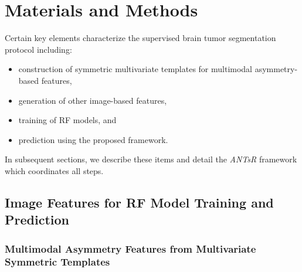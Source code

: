 \documentclass[preprint,authoryear,review,12pt]{elsarticle}
\begin{document}
%
%

\section{Materials and Methods}

Certain key elements characterize the supervised brain tumor segmentation
protocol including:
\begin{itemize}
  \item construction of symmetric multivariate templates for multimodal 
        asymmetry-based features,
  \item generation of other image-based features,
  \item training of RF models, and
  \item prediction using the proposed framework.
\end{itemize}
In subsequent sections, we describe these items and detail the
\textit{ANTsR} framework which coordinates all steps.

\subsection{Image Features for RF Model Training and Prediction}

\subsubsection{Multimodal Asymmetry Features from Multivariate Symmetric Templates}

\setlength{\tabcolsep}{2pt}
\end{document}
